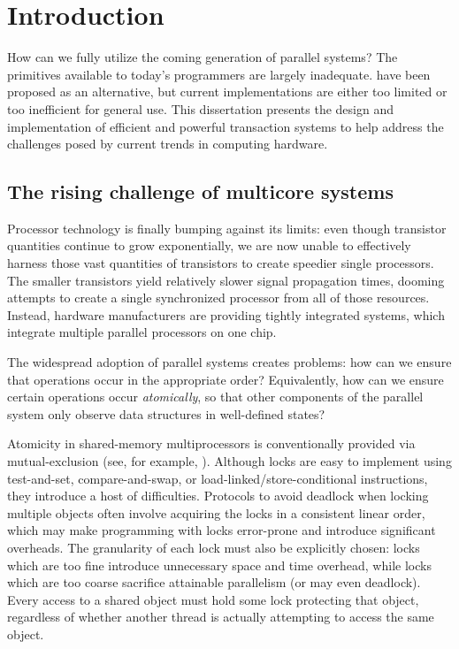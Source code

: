 \chapter{Introduction}\label{sec:intro}

How can we fully utilize the coming generation of parallel systems?
The primitives available to today's programmers are largely
inadequate.   have been proposed as an
alternative, but current implementations are either too limited or too
inefficient for general use.  This dissertation presents the design
and implementation of efficient and powerful transaction systems to
help address the challenges posed by current trends in computing
hardware.

\section{The rising challenge of multicore systems}
Processor technology is finally bumping against its limits: even
though transistor quantities continue to grow exponentially, we are
now unable to effectively harness those vast quantities of transistors
to create speedier single processors.  The smaller transistors yield
relatively slower signal propagation times, dooming attempts to create
a single synchronized processor from all of those resources.
Instead, hardware manufacturers are providing tightly integrated
 systems, which integrate multiple parallel
processors on one chip.

The widespread adoption of parallel systems creates problems: how can
we ensure that operations occur in the appropriate order?
Equivalently, how can we ensure certain operations occur
\textit{atomically}, so that other components of the parallel system
only observe data structures in well-defined states?

Atomicity in shared-memory multiprocessors is 
conventionally provided
via mutual-exclusion  (see, for example,
\cite[p.~35]{Tanenbaum92}).  Although locks are easy to
implement using test-and-set, compare-and-swap, or
load-linked/{\bp}store-conditional instructions, they introduce a host of
difficulties.  Protocols to avoid deadlock when locking multiple
objects often involve acquiring the locks in a consistent linear
order, which may make programming with locks error-prone and introduce
significant overheads.  The granularity of each lock must also be
explicitly chosen: locks which are too fine introduce unnecessary
space and time overhead, while locks which are too coarse sacrifice
attainable parallelism (or may even deadlock).  Every access to a
shared object must hold some lock protecting that object, regardless
of whether another thread is actually attempting to access the same object.

